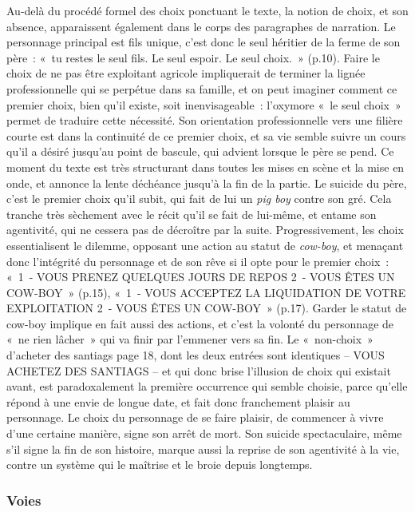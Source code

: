 \documentclass[
]{article}
\begin{document}
Au-delà du procédé formel des choix ponctuant le texte, la notion de choix, et son absence, apparaissent également dans le corps des paragraphes de narration. Le personnage principal est fils unique, c'est donc le seul héritier de la ferme de son père~: «~tu restes le seul fils. Le seul espoir. Le seul choix.~» (p.10). Faire le choix de ne pas être exploitant agricole impliquerait de terminer la lignée professionnelle qui se perpétue dans sa famille, et on peut imaginer comment ce premier choix, bien qu'il existe, soit inenvisageable~: l'oxymore «~le seul choix~» permet de traduire cette nécessité. Son orientation professionnelle vers une filière courte est dans la continuité de ce premier choix, et sa vie semble suivre un cours qu'il a désiré jusqu'au point de bascule, qui advient lorsque le père se pend. Ce moment du texte est très structurant dans toutes les mises en scène et la mise en onde, et annonce la lente déchéance jusqu'à la fin de la partie. Le suicide du père, c'est le premier choix qu'il subit, qui fait de lui un \emph{pig boy} contre son gré. Cela tranche très sèchement avec le récit qu'il se fait de lui-même, et entame son agentivité, qui ne cessera pas de décroître par la suite. Progressivement, les choix essentialisent le dilemme, opposant une action au statut de \emph{cow-boy}, et menaçant donc l'intégrité du personnage et de son rêve si il opte pour le premier choix~: «~1~- VOUS PRENEZ QUELQUES JOURS DE REPOS 2~- VOUS ÊTES UN COW-BOY~» (p.15), «~1~- VOUS ACCEPTEZ LA LIQUIDATION DE VOTRE EXPLOITATION 2~- VOUS ÊTES UN COW-BOY~» (p.17). Garder le statut de cow-boy implique en fait aussi des actions, et c'est la volonté du personnage de «~ne rien lâcher~» qui va finir par l'emmener vers sa fin. Le «~non-choix~» d'acheter des santiags page 18, dont les deux entrées sont identiques -- VOUS ACHETEZ DES SANTIAGS -- et qui donc brise l'illusion de choix qui existait avant, est paradoxalement la première occurrence qui semble choisie, parce qu'elle répond à une envie de longue date, et fait donc franchement plaisir au personnage. Le choix du personnage de se faire plaisir, de commencer à vivre d'une certaine manière, signe son arrêt de mort. Son suicide spectaculaire, même s'il signe la fin de son histoire, marque aussi la reprise de son agentivité à la vie, contre un système qui le maîtrise et le broie depuis longtemps.

\subsubsection{Voies}\label{voies}
\end{document}
